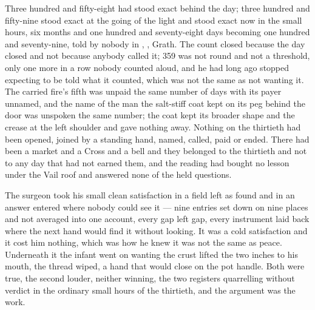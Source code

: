 \scenebreak

Three hundred and fifty-eight had stood exact behind the day; three hundred and fifty-nine stood exact at the going of the light and stood exact now in the small hours, six months and one hundred and seventy-eight days becoming one hundred and seventy-nine, told by nobody in , , Grath. The count closed because the day closed and not because anybody called it; 359 was not round and not a threshold, only one more in a row nobody counted aloud, and he had long ago stopped expecting to be told what it counted, which was not the same as not wanting it. The carried fire's fifth was unpaid the same number of days with its payer unnamed, and the name of the man the salt-stiff coat kept on its peg behind the door was unspoken the same number; the coat kept its broader shape and the crease at the left shoulder and gave nothing away. Nothing on the thirtieth had been opened, joined by a standing hand, named, called, paid or ended. There had been a market and a Cross and a bell and they belonged to the thirtieth and not to any day that had not earned them, and the reading had bought no lesson under the Vail roof and answered none of the held questions.

The surgeon took his small clean satisfaction in a field left as found and in an answer entered where nobody could see it --- nine entries set down on nine places and not averaged into one account, every gap left gap, every instrument laid back where the next hand would find it without looking. It was a cold satisfaction and it cost him nothing, which was how he knew it was not the same as peace. Underneath it the infant went on wanting the crust lifted the two inches to his mouth, the thread wiped, a hand that would close on the pot handle. Both were true, the second louder, neither winning, the two registers quarrelling without verdict in the ordinary small hours of the thirtieth, and the argument was the work.

